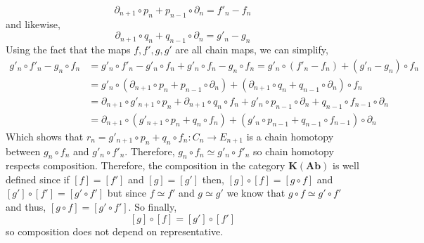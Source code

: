 \documentclass[12pt]{extarticle}
\begin{document}
\[ \partial_{n+1} \circ p_n + p_{n-1} \circ \partial_n = f'_n - f_n \]
and likewise,
\[ \partial_{n+1} \circ q_n + q_{n-1} \circ \partial_n = g'_n - g_n \] 
Using the fact that the maps $f, f', g, g'$ are all chain maps, we can simplify,
\begin{align*}
g'_n \circ f'_n - g_n \circ f_n & = g'_n \circ f'_n - g'_n \circ f_n + g'_n \circ f_n - g_n \circ f_n = g'_n \circ (f'_n - f_n) + (g'_n - g_n) \circ f_n 
\\
& = g'_n \circ (\partial_{n+1} \circ p_n + p_{n-1} \circ \partial_n) + (\partial_{n+1} \circ q_n + q_{n-1} \circ \partial_n) \circ f_n
\\
& = \partial_{n+1} \circ g'_{n+1} \circ p_n + \partial_{n+1} \circ q_n \circ f_n + g'_n \circ p_{n-1} \circ \partial_n + q_{n-1} \circ f_{n-1} \circ \partial_{n}
\\
& = \partial_{n+1} \circ (g'_{n+1} \circ p_n + q_n \circ f_n) + (g'_n \circ p_{n-1} + q_{n-1} \circ f_{n-1}) \circ \partial_n 
\end{align*}
Which shows that $r_n = g'_{n+1} \circ p_n + q_n \circ f_n : C_n \to E_{n+1}$ is a chain homotopy between $g_n \circ f_n$ and $g'_n \circ f'_n$. Therefore, $g_n \circ f_n \simeq g'_n \circ f'_n$ so chain homotopy respects composition. Therefore, the composition in the category $\mathbf{K(Ab)}$ is well defined since if $[f] =[f']$ and $[g] = [g']$ then,
$[g] \circ [f] = [g \circ f]$ and $[g'] \circ [f'] = [g' \circ f']$ but since $f \simeq f'$ and $g \simeq g'$ we know that $g \circ f \simeq g' \circ f'$ and thus, $[g \circ f] = [g' \circ f']$. So finally,
\[ [g] \circ [f] = [g'] \circ [f'] \]
so composition does not depend on representative. 
\end{document}
